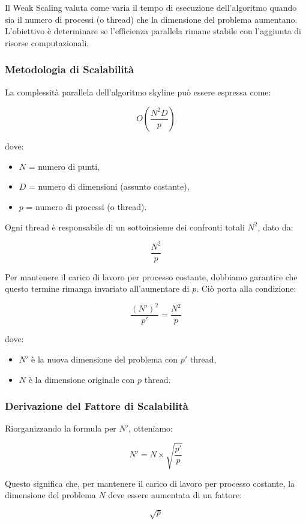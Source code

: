 \documentclass[letterpaper,11pt,leqno]{article}
\begin{document}
Il Weak Scaling valuta come varia il tempo di esecuzione dell'algoritmo quando sia il numero di processi (o thread) che la dimensione del problema aumentano. L'obiettivo è determinare se l'efficienza parallela rimane stabile con l'aggiunta di risorse computazionali.

\subsubsection{Metodologia di Scalabilità}
La complessità parallela dell'algoritmo skyline può essere espressa come:

\[
O\left(\frac{N^2 D}{p}\right)
\]

dove:
\begin{itemize}
    \item \( N \) = numero di punti,
    \item \( D \) = numero di dimensioni (assunto costante),
    \item \( p \) = numero di processi (o thread).
\end{itemize}

Ogni thread è responsabile di un sottoinsieme dei confronti totali \( N^2 \), dato da:

\[
\frac{N^2}{p}
\]

Per mantenere il carico di lavoro per processo costante, dobbiamo garantire che questo termine rimanga invariato all'aumentare di \( p \). Ciò porta alla condizione:

\[
\frac{(N')^2}{p'} = \frac{N^2}{p}
\]

dove:
\begin{itemize}
    \item \( N' \) è la nuova dimensione del problema con \( p' \) thread,
    \item \( N \) è la dimensione originale con \( p \) thread.
\end{itemize}

\subsubsection{Derivazione del Fattore di Scalabilità}
Riorganizzando la formula per \( N' \), otteniamo:

\[
N' = N \times \sqrt{\frac{p'}{p}}
\]

Questo significa che, per mantenere il carico di lavoro per processo costante, la dimensione del problema \( N \) deve essere aumentata di un fattore:

\[
\sqrt{p}
\]
\end{document}
